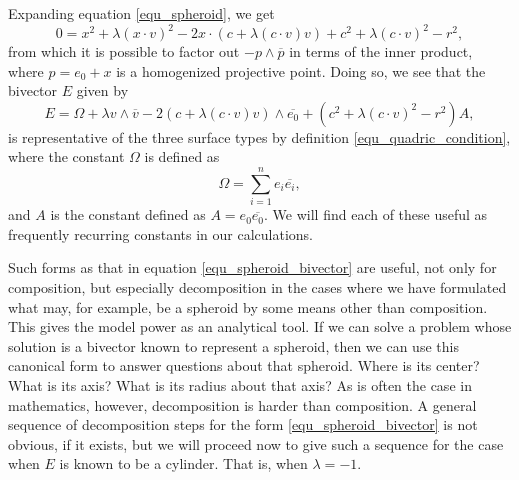 \documentclass{birkjour}
\theoremstyle{definition}
\theoremstyle{remark}
\numberwithin{equation}{section}
\begin{document}
Expanding equation \eqref{equ_spheroid}, we get
\begin{equation}
0 = x^2 + \lambda(x\cdot v)^2 - 2x\cdot (c+\lambda(c\cdot v)v) + c^2 + \lambda(c\cdot v)^2 - r^2,
\end{equation}
from which it is possible to factor out $-p\wedge\overline{p}$
in terms of the inner product, where $p=e_0+x$
is a homogenized projective point.  Doing so, we see that the bivector
$E$ given by
\begin{equation}\label{equ_spheroid_bivector}
E = \Omega + \lambda v\wedge\overline{v} - 2(c+\lambda(c\cdot v)v)\wedge\overline{e_0} + (c^2+\lambda(c\cdot v)^2-r^2)A,
\end{equation}
is representative of the three surface types by definition \eqref{equ_quadric_condition}, where the constant
$\Omega$ is defined as
\begin{equation}
\Omega=\sum_{i=1}^n e_i\overline{e_i},
\end{equation}
and $A$ is the constant defined as $A=e_0\overline{e_0}$.  We will find each of these useful as
frequently recurring constants in our calculations.

Such forms as that in equation \eqref{equ_spheroid_bivector} are useful, not only
for composition, but especially decomposition in the cases
where we have formulated what may, for example, be a spheroid by some means
other than composition.
This gives the model power as an analytical tool.  If we can solve a problem whose solution
is a bivector known to represent a spheroid, then we can use this canonical form to answer
questions about that spheroid.  Where is its center?  What is its axis?  What is its radius
about that axis?  As is often the case in mathematics, however, decomposition is
harder than composition.  A general sequence of decomposition steps for the
form \eqref{equ_spheroid_bivector} is not obvious, if it exists, but we will
proceed now to give such a sequence for the case when $E$ is known
to be a cylinder.  That is, when $\lambda=-1$.
\end{document}
